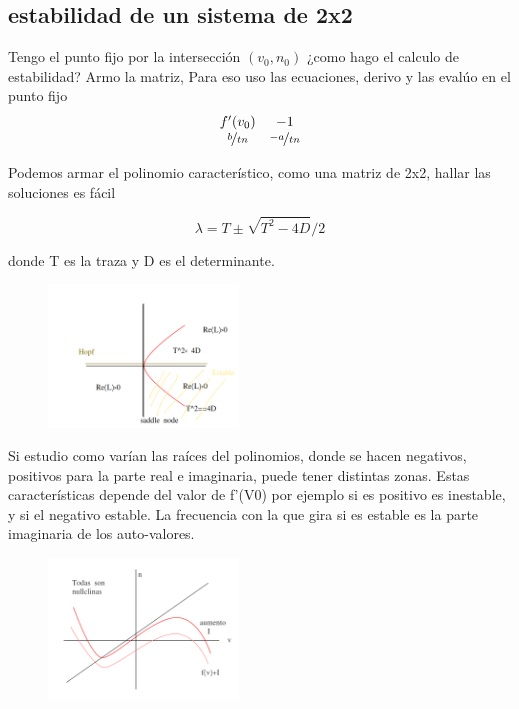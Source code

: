 \subsection{estabilidad de un sistema de 2x2}

Tengo el punto fijo por la intersección $(v_0,n_0)$ ¿como  hago el calculo de estabilidad? Armo la matriz, Para eso uso las ecuaciones, derivo y las evalúo en el punto fijo
\[
\begin{matrix}
	f'(v_0) &  -1   \\
	\nicefrac{b}{tn}& \nicefrac{-a}{tn} \\
\end{matrix}
\]

Podemos armar el polinomio característico, como una matriz de 2x2, hallar las soluciones es fácil

\begin{equation}
	\lambda = T \pm \sqrt{T^2 - 4D}/ 2
\end{equation}

donde T es la traza y D es el determinante.

\begin{figure}[htbp]
	\centering
	\includegraphics[width=0.45\textwidth]{2.png}
\end{figure}



Si estudio como varían las raíces del polinomios, donde se hacen negativos, positivos para la parte real e imaginaria, puede tener distintas zonas. Estas características depende del valor de f'(V0) por ejemplo si es positivo es inestable, y si el negativo estable. La frecuencia con la que gira si es estable es la parte imaginaria de los auto-valores.

\begin{figure}[htbp]
	\centering
	\includegraphics[width=0.45\textwidth]{3.png}
\end{figure}



